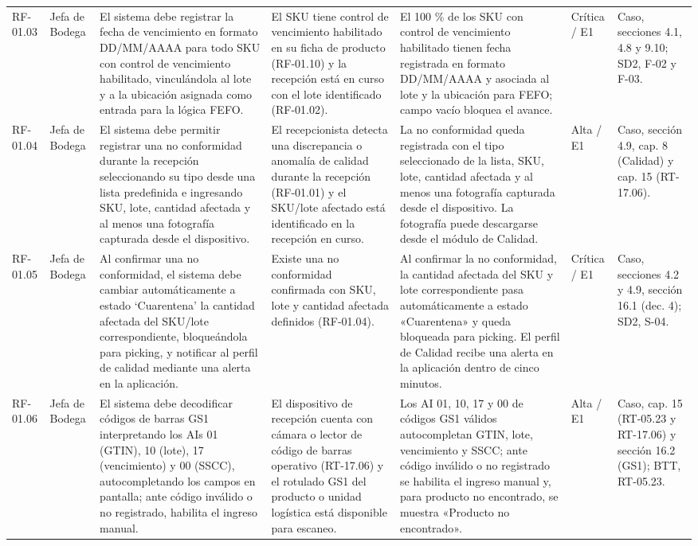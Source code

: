 {\begin{longtable}{@{}F{0.062} F{0.080} F{0.195} F{0.160} F{0.240} F{0.093} F{0.170}@{}}
  RF-01.03 & Jefa de Bodega & El sistema debe registrar la fecha de vencimiento en formato DD/MM/AAAA para todo SKU con control de vencimiento habilitado, vinculándola al lote y a la ubicación asignada como entrada para la lógica FEFO. & El SKU tiene control de vencimiento habilitado en su ficha de producto (RF-01.10) y la recepción está en curso con el lote identificado (RF-01.02). & El 100 \% de los SKU con control de vencimiento habilitado tienen fecha registrada en formato DD/MM/AAAA y asociada al lote y la ubicación para FEFO; campo vacío bloquea el avance. & Crítica / E1 & Caso, secciones 4.1, 4.8 y 9.10; SD2, F-02 y F-03. \\
  RF-01.04 & Jefa de Bodega & El sistema debe permitir registrar una no conformidad durante la recepción seleccionando su tipo desde una lista predefinida e ingresando SKU, lote, cantidad afectada y al menos una fotografía capturada desde el dispositivo. & El recepcionista detecta una discrepancia o anomalía de calidad durante la recepción (RF-01.01) y el SKU/lote afectado está identificado en la recepción en curso. & La no conformidad queda registrada con el tipo seleccionado de la lista, SKU, lote, cantidad afectada y al menos una fotografía capturada desde el dispositivo. La fotografía puede descargarse desde el módulo de Calidad. & Alta / E1 & Caso, sección 4.9, cap. 8 (Calidad) y cap. 15 (RT-17.06). \\
  RF-01.05 & Jefa de Bodega & Al confirmar una no conformidad, el sistema debe cambiar automáticamente a estado ‘Cuarentena’ la cantidad afectada del SKU/lote correspondiente, bloqueándola para picking, y notificar al perfil de calidad mediante una alerta en la aplicación. & Existe una no conformidad confirmada con SKU, lote y cantidad afectada definidos (RF-01.04). & Al confirmar la no conformidad, la cantidad afectada del SKU y lote correspondiente pasa automáticamente a estado «Cuarentena» y queda bloqueada para picking. El perfil de Calidad recibe una alerta en la aplicación dentro de cinco minutos. & Crítica / E1 & Caso, secciones 4.2 y 4.9, sección 16.1 (dec. 4); SD2, S-04. \\
  RF-01.06 & Jefa de Bodega & El sistema debe decodificar códigos de barras GS1 interpretando los AIs 01 (GTIN), 10 (lote), 17 (vencimiento) y 00 (SSCC), autocompletando los campos en pantalla; ante código inválido o no registrado, habilita el ingreso manual. & El dispositivo de recepción cuenta con cámara o lector de código de barras operativo (RT-17.06) y el rotulado GS1 del producto o unidad logística está disponible para escaneo. & Los AI 01, 10, 17 y 00 de códigos GS1 válidos autocompletan GTIN, lote, vencimiento y SSCC; ante código inválido o no registrado se habilita el ingreso manual y, para producto no encontrado, se muestra «Producto no encontrado». & Alta / E1 & Caso, cap. 15 (RT-05.23 y RT-17.06) y sección 16.2 (GS1); BTT, RT-05.23. \\

\end{longtable}}

